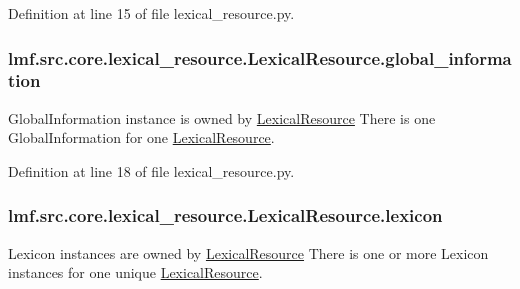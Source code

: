 Definition at line 15 of file lexical\+\_\+resource.\+py.

\hypertarget{classlmf_1_1src_1_1core_1_1lexical__resource_1_1_lexical_resource_a0d5cc63c48e3c5aa2bea6ad21c288e4f}{
\subsubsection[{global\+\_\+information}]{\setlength{\rightskip}{0pt plus 5cm}lmf.\+src.\+core.\+lexical\+\_\+resource.\+Lexical\+Resource.\+global\+\_\+information}}\label{classlmf_1_1src_1_1core_1_1lexical__resource_1_1_lexical_resource_a0d5cc63c48e3c5aa2bea6ad21c288e4f}


Global\+Information instance is owned by \hyperlink{classlmf_1_1src_1_1core_1_1lexical__resource_1_1_lexical_resource}{Lexical\+Resource} There is one Global\+Information for one \hyperlink{classlmf_1_1src_1_1core_1_1lexical__resource_1_1_lexical_resource}{Lexical\+Resource}. 



Definition at line 18 of file lexical\+\_\+resource.\+py.

\hypertarget{classlmf_1_1src_1_1core_1_1lexical__resource_1_1_lexical_resource_af4146645965f04411b37e8e52e7a04e0}{
\subsubsection[{lexicon}]{\setlength{\rightskip}{0pt plus 5cm}lmf.\+src.\+core.\+lexical\+\_\+resource.\+Lexical\+Resource.\+lexicon}}\label{classlmf_1_1src_1_1core_1_1lexical__resource_1_1_lexical_resource_af4146645965f04411b37e8e52e7a04e0}


Lexicon instances are owned by \hyperlink{classlmf_1_1src_1_1core_1_1lexical__resource_1_1_lexical_resource}{Lexical\+Resource} There is one or more Lexicon instances for one unique \hyperlink{classlmf_1_1src_1_1core_1_1lexical__resource_1_1_lexical_resource}{Lexical\+Resource}. 



